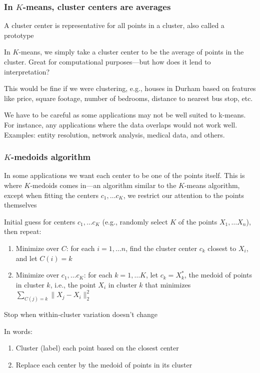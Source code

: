 \documentclass[mathserif]{beamer}
\def\blue{\color[rgb]{0,0,0.8}}
\begin{document}
\begin{frame}
\frametitle{In $K$-means, cluster centers are averages}
\smallskip
A cluster center is representative for all 
points in a cluster, also called a 
{\blue prototype}

\bigskip
In $K$-means, we simply take a cluster center to be 
the {\blue average} of points in the cluster.
Great for computational purposes---but how
does it lend to {\blue interpretation}?

\bigskip
This would be fine if we were clustering, e.g., houses in 
Durham based on features like price, square footage,
number of bedrooms, distance to nearest bus stop, etc.

\bigskip
We have to be careful as some applications may not be well suited to k-means. For instance, 
any applications where the data overlaps would not work well. Examples: entity resolution, network analysis, medical data, and others.

%
\end{frame}

\begin{frame}
\smallskip
\frametitle{$K$-medoids algorithm}
In some applications we want each center
to be {\blue one of the points} itself.
This is where {\blue $K$-medoids} comes in---an
algorithm similar to 
the $K$-means algorithm, except when fitting
the centers $c_1,\ldots c_K$, we restrict our
attention to the points themselves

\bigskip
Initial guess for centers $c_1,\ldots c_K$ (e.g., randomly
select $K$ of the points $X_1,\ldots X_n$), then repeat:
\begin{enumerate}
\item {\blue Minimize over $C$}: for each  
$i=1,\ldots n$, find the cluster center $c_k$ closest 
to $X_i$, and let $C(i)=k$
\item {\blue Minimize over $c_1,\ldots c_K$}: for each 
$k=1,\ldots K$, let $c_k = X^*_k$, the
{\blue medoid} of points in cluster $k$, i.e., the point 
$X_i$ in cluster $k$ that minimizes
$\sum_{C(j)=k} \|X_j-X_i\|_2^2$
\end{enumerate}
Stop when within-cluster variation doesn't change

\bigskip
In words:
\begin{enumerate}
\item Cluster (label) each point based on the closest center
\item Replace each center by the medoid of points in its cluster
\end{enumerate}
\end{frame}
\end{document}
